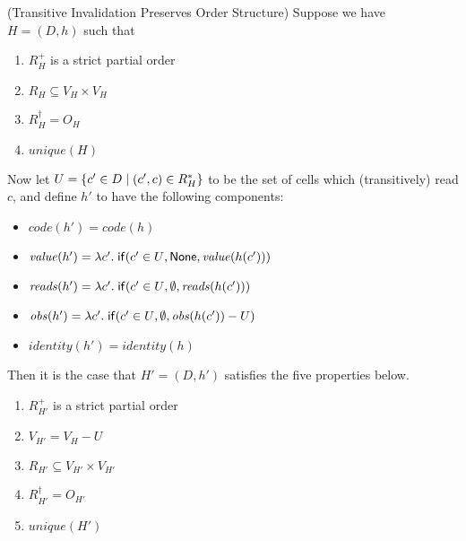 \begin{lemma}{(Transitive Invalidation Preserves Order Structure)}
Suppose we have $H = (D,h)$ such that 
\begin{enumerate}
\item $R^+_H$ is a strict partial order 
\item $R_H \subseteq V_H \times V_H$
\item $R^\dagger_H = O_H$ 
\item $\mathit{unique}(H)$
\end{enumerate}

Now let $U = \{{{c' \in D}\;|\;{(c',c) \in R^*_H}}\}$ to be the set of
cells which (transitively) read $c$, and define $h'$ to have the
following components:

\begin{itemize}
\item $\mathit{code}(h') = \mathit{code}(h)$
\item $\mathit{value}(h') = \lambda c'.\;\mathsf{if}({c'\in U}, {\mathsf{None}}, {\mathit{value}(h(c'))})$
\item $\mathit{reads}(h') = \lambda c'.\;\mathsf{if}({c'\in U}, {\emptyset}, {\mathit{reads}(h(c'))})$
\item $\mathit{obs}(h') = \lambda c'.\;\mathsf{if}({c'\in U}, {\emptyset}, {\mathit{obs}(h(c')) - U})$
\item $\mathit{identity}(h') = \mathit{identity}(h)$
\end{itemize}

\noindent Then it is the case that $H' = (D,h')$ satisfies the five properties below. 
\begin{enumerate}
\item $R^+_{H'}$ is a strict partial order 
\item $V_{H'} = V_H - U$
\item $R_{H'} \subseteq V_{H'} \times V_{H'}$
\item $R^\dagger_{H'} = O_{H'}$ 
\item $\mathit{unique}(H')$
\end{enumerate}
\end{lemma}

